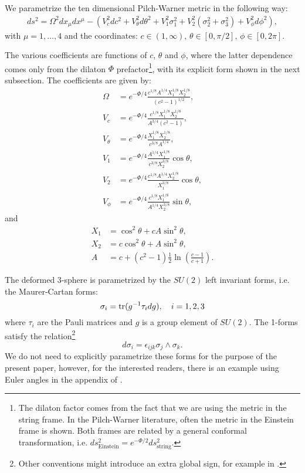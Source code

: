 We parametrize the ten dimensional Pilch-Warner metric in the following way:
\begin{align}\label{eq:PWmetric}
ds^2 =
\Omega^2 dx_\mu dx^\mu -\left(
V_c^2 dc^2 + V_\theta^2 d\theta^2 + V_1^2 \sigma_1^2 + V_2^2 (\sigma_2^2 + \sigma_3^2) + V_\phi^2 d\phi^2\right),
\end{align}
with $\mu=1,\ldots,4$ and the coordinates: $c\in(1, \infty), \, \theta \in [0, \pi/2], \, \phi \in [0, 2\pi]$. 

The various coefficients are functions of $c$, $\theta$ and $\phi$, where the latter dependence comes only from the dilaton $\Phi$ prefactor\footnote{The dilaton factor comes from the fact that we are using the metric in the string frame. In the Pilch-Warner literature, often the metric in the Einstein frame is shown. Both frames are related by a general conformal transformation, i.e. $ds^2_\text{Einstein} = e^{-\Phi / 2} ds^2_\text{string}$.}, with its explicit form shown in the next subsection. 
The coefficients are given by:
\begin{align}\label{eq:PWvielbeins}
\Omega &=e^{-\Phi/4} \frac{c^{1/8} A^{1/4} X_1^{1/8} X_2^{1/8}}{(c^2 - 1)^{1/2}},\nonumber\\
V_c &= e^{-\Phi/4}\frac{c^{1/8}X_1^{1/8} X_2^{1/8}}{A^{3/4} (c^2-1)},\nonumber\\
V_\theta &= e^{-\Phi/4}\frac{X_1^{1/8} X_2^{1/8}}{c^{3/8}A^{1/4}},\nonumber\\
V_1 &= e^{-\Phi/4}\frac{A^{1/4}X_1^{1/8} }{c^{3/8}X_2^{3/8}} \cos\theta,\nonumber\\
V_2 &= e^{-\Phi/4}\frac{c^{1/8}A^{1/4}X_2^{1/8} }{X_1^{3/8}} \cos\theta, \nonumber\\
V_\phi &= e^{-\Phi/4}\frac{c^{1/8}X_1^{1/8} }{A^{1/4}X_2^{3/8}} \sin\theta,
\end{align}
and
\begin{align}
X_1 &=  \cos^2\theta + cA  \sin^2\theta,\nonumber\\
X_2 &= c \cos^2\theta + A  \sin^2\theta, \nonumber\\
A &= c+(c^2 -1)\frac{1}{2}\ln\left(\frac{c-1}{c+1}\right).
\end{align}

The deformed 3-sphere is parametrized by the $SU(2)$ left invariant forms, i.e. the Maurer-Cartan forms:
\begin{equation}
\sigma_i = \mathop{\mathrm{tr}}(g^{-1}\tau_i d g), \quad i = 1,2,3
\end{equation}
where $\tau_i$ are the Pauli matrices and $g$ is a group element of $SU(2)$. The 1-forms satisfy the relation\footnote{Other conventions might introduce an extra global sign, for example in \cite{Buchel:2000cn}.}
\begin{equation}
 d\sigma_i  = \epsilon_{i j k} \sigma_j \wedge \sigma_k.
\end{equation}
We do not need to explicitly parametrize these forms for the purpose of the present paper, however, for the interested readers, there is an example using Euler angles in the appendix of \cite{Chen-Lin:2015xlh}. 


